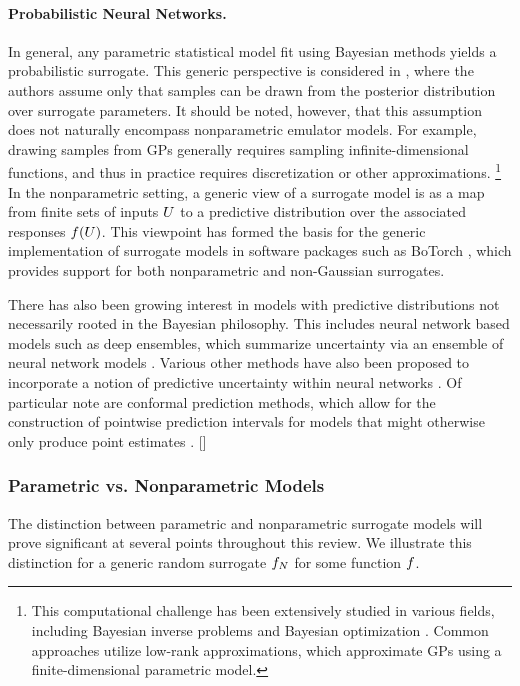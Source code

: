 \documentclass[12pt]{article}
\begin{document}
\paragraph{Probabilistic Neural Networks.}
In general, any parametric statistical model fit using Bayesian methods yields a probabilistic
surrogate. This generic perspective is considered in \citep{BurknerSurrogate}, where the 
authors assume only that samples can be drawn from the posterior distribution over 
surrogate parameters. It should be noted, however, that this assumption does not naturally 
encompass nonparametric emulator models. For example, drawing samples from GPs 
generally requires sampling infinite-dimensional functions, and thus in practice requires 
discretization or other approximations.
\footnote{This computational challenge has been extensively studied in various fields, including
Bayesian inverse problems \citep{dimRedPolyChaos,functionSpaceMCMC} 
and Bayesian optimization \citep{pathwiseConditioning,samplingGPPosts}. 
Common approaches utilize low-rank approximations, which approximate GPs using a 
finite-dimensional parametric model.} In the nonparametric setting, a generic view of a 
surrogate model is as a map from finite sets of inputs $\parMat$ to a predictive distribution 
over the associated responses $\func(\parMat)$. This viewpoint has formed the basis 
for the generic implementation of surrogate models in software packages such as 
BoTorch \citep{botorch}, which provides support for both nonparametric and non-Gaussian surrogates. 

There has also been growing interest in models with predictive distributions not necessarily 
rooted in the Bayesian philosophy. This includes neural network based models such 
as deep ensembles, which summarize uncertainty via an ensemble of neural network 
models \citep{deepEnsembles}. Various other methods have also been proposed to 
incorporate a notion of predictive uncertainty within neural networks \citep{epistemicNN}.
Of particular note are conformal prediction methods, which allow for the construction of 
pointwise prediction intervals for models that might otherwise only produce point 
estimates \citep{conformalSurrogate,conformalGP,conformalTwoStageDesign,conformalEvidentialSurrogate,conformalBayesOpt}.
[]

\subsubsection{Parametric vs. Nonparametric Models}
The distinction between parametric and nonparametric surrogate models will 
prove significant at several points throughout this review. We illustrate this
distinction for a generic random surrogate $\funcEm[\Ndesign]$ for some 
function $\func$. 
\end{document}
